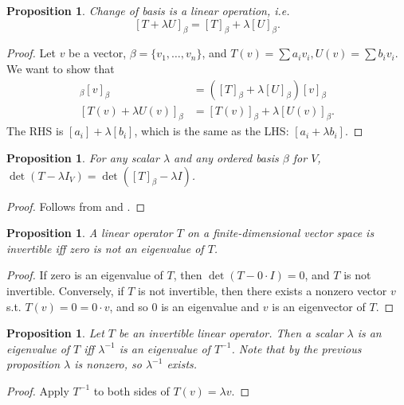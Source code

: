 \documentclass[12pt]{article}
\theoremstyle{plain}
\newtheorem{proposition}[theorem]{Proposition}
\theoremstyle{definition}
\theoremstyle{remark}
\begin{document}
\begin{proposition}\label{changeofbasislinear}
Change of basis is a linear operation, i.e. $$[T + \lambda U]_\beta = [T]_\beta + \lambda[U]_\beta.$$
\end{proposition}

\begin{proof}
Let $v$ be a vector, $\beta = \{v_1,\ldots, v_n\}$, and $T(v) = \sum a_i v_i, U(v) = \sum b_i v_i$. We want to show that
\begin{align*}
[T + \lambda U]_\beta [v]_\beta &= ([T]_\beta + \lambda[U]_\beta)[v]_\beta \\
[T(v) + \lambda U(v)]_\beta &= [T(v)]_\beta + \lambda[U(v)]_\beta.
\end{align*}
The RHS is $[a_i] + \lambda [b_i]$, which is the same as the LHS: $[a_i + \lambda b_i]$.
\end{proof}

\begin{proposition}
For any scalar $\lambda$ and any ordered basis $\beta$ for $V$, $\det(T - \lambda I_V) = \det([T]_\beta - \lambda I)$.
\end{proposition}

\begin{proof}
Follows from  and .
\end{proof}

\begin{proposition}
A linear operator $T$ on a finite-dimensional vector space is invertible iff zero is not an eigenvalue of $T$.
\end{proposition}

\begin{proof}
If zero is an eigenvalue of $T$, then $\det(T - 0 \cdot I) = 0$, and $T$ is not invertible. Conversely, if $T$ is not invertible, then there exists a nonzero vector $v$ s.t. $T(v) = 0 = 0 \cdot v$, and so 0 is an eigenvalue and $v$ is an eigenvector of $T$.
\end{proof}

\begin{proposition}
Let $T$ be an invertible linear operator. Then a scalar $\lambda$ is an eigenvalue of $T$ iff $\lambda^{-1}$ is an eigenvalue of $T^{-1}$. Note that by the previous proposition $\lambda$ is nonzero, so $\lambda^{-1}$ exists.
\end{proposition}

\begin{proof}
Apply $T^{-1}$ to both sides of $T(v) = \lambda v$.
\end{proof}
\end{document}

